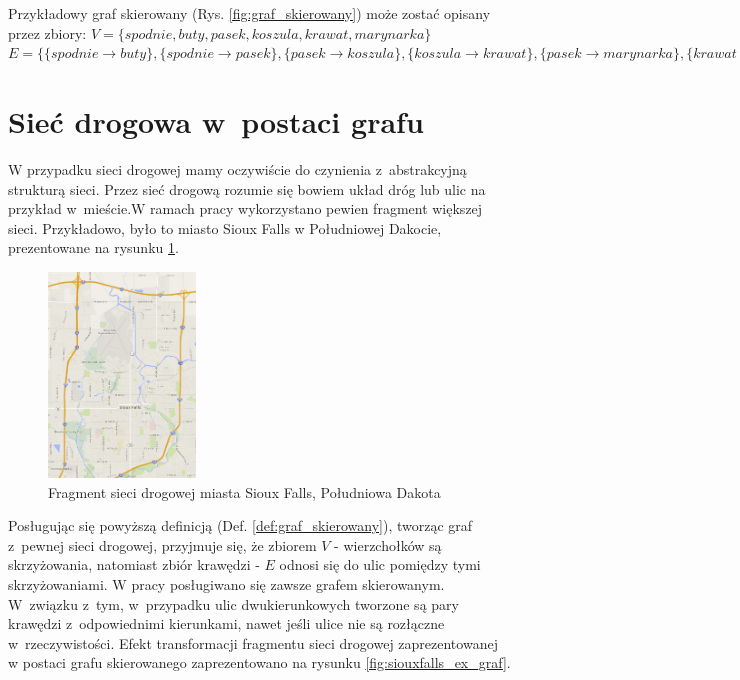 \documentclass[twoside,12pt]{report}
\begin{document}
Przykładowy graf skierowany (Rys. \ref{fig:graf_skierowany}) może zostać opisany przez zbiory:
\newline
\begin{math}
V=\{spodnie, buty, pasek, koszula, krawat, marynarka\}
\end{math}
\newline
\begin{math}
E=\{\{spodnie \rightarrow buty\},\{spodnie  \rightarrow pasek\},
	\{pasek \rightarrow koszula\},\{koszula \rightarrow krawat\},
	\{pasek \rightarrow marynarka\},\{krawat \rightarrow marynarka\}\}
\end{math}

\section{Sieć drogowa w~postaci grafu}
W przypadku sieci drogowej mamy oczywiście do czynienia z~abstrakcyjną strukturą sieci. Przez sieć drogową rozumie się bowiem układ dróg lub ulic na przykład w~mieście.W ramach pracy wykorzystano pewien fragment większej sieci. Przykładowo, było to miasto Sioux Falls w Południowej Dakocie, prezentowane na rysunku \ref{fig:fragment_sieci_siouxfalls}. 

\begin{figure}[ht]
	\centering
	\includegraphics[width=0.35\textwidth]{img/siec}
	\caption{Fragment sieci drogowej miasta Sioux Falls, Południowa Dakota} 
	\label{fig:fragment_sieci_siouxfalls}
\end{figure}

Posługując się powyższą definicją (Def. \ref{def:graf_skierowany}), tworząc graf z~pewnej sieci drogowej, przyjmuje się, że zbiorem $V$ - wierzchołków są skrzyżowania, natomiast zbiór krawędzi - $E$ odnosi się do ulic pomiędzy tymi skrzyżowaniami. W pracy posługiwano się zawsze grafem skierowanym. W~związku z~tym, w~przypadku ulic dwukierunkowych tworzone są pary krawędzi z~odpowiednimi kierunkami, nawet jeśli ulice nie są rozłączne w~rzeczywistości. Efekt transformacji fragmentu sieci drogowej zaprezentowanej w postaci grafu skierowanego zaprezentowano na rysunku \ref{fig:siouxfalls_ex_graf}.
\end{document}
